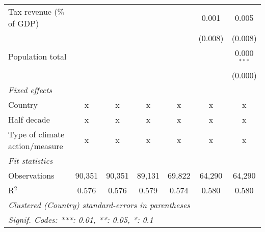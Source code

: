 \begin{tabular}{lcccccc}
   Tax revenue (\% of GDP)              &         &               &                &               & 0.001         & 0.005\\   
                                        &         &               &                &               & (0.008)       & (0.008)\\   
   Population total                     &         &               &                &               &               & 0.000$^{***}$\\   
                                        &         &               &                &               &               & (0.000)\\   
   \emph{Fixed effects}\\
   Country                              & x       & x             & x              & x             & x             & x\\  
   Half decade                          & x       & x             & x              & x             & x             & x\\  
   Type of climate action/measure       & x       & x             & x              & x             & x             & x\\  
   \midrule \emph{Fit statistics}\\
   Observations                         & 90,351  & 90,351        & 89,131         & 69,822        & 64,290        & 64,290\\  
   R$^2$                                & 0.576   & 0.576         & 0.579          & 0.574         & 0.580         & 0.580\\  
   \midrule
   \multicolumn{7}{l}{\emph{Clustered (Country) standard-errors in parentheses}}\\
   \multicolumn{7}{l}{\emph{Signif. Codes: ***: 0.01, **: 0.05, *: 0.1}}\\
\end{tabular}
\par\endgroup



